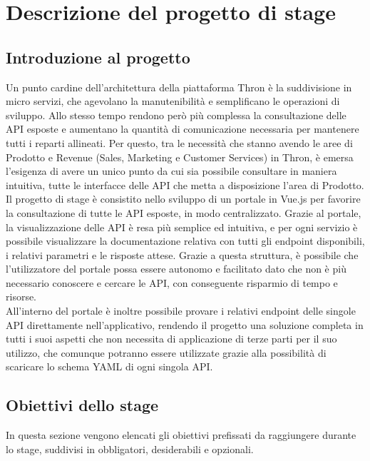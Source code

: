 \chapter{Descrizione del progetto di stage}
\label{cap:descrizione-stage}


\section{Introduzione al progetto}
Un punto cardine dell'architettura della piattaforma Thron è la suddivisione in micro servizi, che agevolano la manutenibilità e semplificano le operazioni di sviluppo.
Allo stesso tempo rendono però più complessa la consultazione delle API esposte e aumentano la quantità di comunicazione necessaria per mantenere tutti i reparti allineati.
Per questo, tra le necessità che stanno avendo le aree di Prodotto e Revenue (Sales, Marketing e Customer Services) in Thron, è emersa l'esigenza di avere un unico punto
da cui sia possibile consultare in maniera intuitiva, tutte le interfacce delle API che metta a disposizione l'area di Prodotto.\\
Il progetto di stage è consistito nello sviluppo di un portale in Vue.js per favorire la consultazione di tutte le API esposte, in modo centralizzato.
Grazie al portale, la visualizzazione delle API è resa più semplice ed intuitiva, e per ogni servizio è possibile visualizzare la documentazione relativa 
con tutti gli endpoint disponibili, i relativi parametri e le risposte attese. Grazie a questa struttura, è possibile che l'utilizzatore del portale possa essere autonomo 
e facilitato dato che non è più necessario conoscere e cercare le API, con conseguente risparmio di tempo e risorse.\\
All'interno del portale è inoltre possibile provare i relativi endpoint delle singole API direttamente nell'applicativo, rendendo il progetto una soluzione completa
in tutti i suoi aspetti che non necessita di applicazione di terze parti per il suo utilizzo, che comunque potranno essere utilizzate grazie alla possibilità di scaricare
lo schema YAML di ogni singola API.


\section{Obiettivi dello stage}
In questa sezione vengono elencati gli obiettivi prefissati da raggiungere durante lo stage, suddivisi in obbligatori, desiderabili e opzionali.

